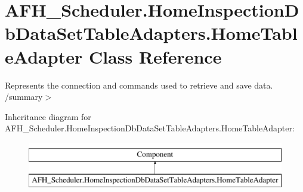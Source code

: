 \section{A\+F\+H\+\_\+\+Scheduler.\+Home\+Inspection\+Db\+Data\+Set\+Table\+Adapters.\+Home\+Table\+Adapter Class Reference}
\label{class_a_f_h___scheduler_1_1_home_inspection_db_data_set_table_adapters_1_1_home_table_adapter}


Represents the connection and commands used to retrieve and save data. /summary$>$  


Inheritance diagram for A\+F\+H\+\_\+\+Scheduler.\+Home\+Inspection\+Db\+Data\+Set\+Table\+Adapters.\+Home\+Table\+Adapter\+:\begin{figure}[H]
\begin{center}
\leavevmode
\includegraphics[height=2.000000cm]{class_a_f_h___scheduler_1_1_home_inspection_db_data_set_table_adapters_1_1_home_table_adapter}
\end{center}
\end{figure}
